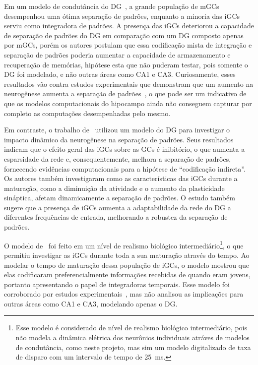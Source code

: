 Em um modelo de condutância do DG~\cite{kimEffect2024}, a grande população de mGCs desempenhou uma ótima separação de padrões,
enquanto a minoria das iGCs serviu como integradora de padrões. A presença das iGCs deteriorou a capacidade de separação de
padrões do DG em comparação com um DG composto apenas por mGCs, porém os autores postulam que essa codificação mista de integração
e separação de padrões poderia aumentar a capacidade de armazenamento e recuperação de memórias, hipótese esta que não puderam
testar, pois somente o DG foi modelado, e não outras áreas como CA1 e CA3. Curiosamente, esses resultados vão contra estudos
experimentais que demonstram que um aumento na neurogênese aumenta a separação de padrões~\cite{sahayIncreasing2011}, o que pode
ser um indicativo de que os modelos computacionais do hipocampo ainda não conseguem capturar por completo as computações
desempenhadas pelo mesmo.

Em contraste, o trabalho de~ utilizou um modelo do DG para investigar o impacto dinâmico da
neurogênese na separação de padrões. Seus resultados indicam que o efeito geral das iGCs sobre as GCs é inibitório, o que aumenta
a esparsidade da rede e, consequentemente, melhora a separação de padrões, fornecendo evidências computacionais para a hipótese de
``codificação indireta''. Os autores também investigaram como as características das iGCs durante a maturação, como a diminuição
da atividade e o aumento da plasticidade sináptica, afetam dinamicamente a separação de padrões. O estudo também sugere que a
presença de iGCs aumenta a adaptabilidade da rede do DG a diferentes frequências de entrada, melhorando a robustez da separação de
padrões.

O modelo de~ foi feito em um nível de realismo biológico intermediário\footnote{Esse modelo é
considerado de nível de realismo biológico intermediário, pois não modela a dinâmica elétrica dos neurônios individuais atráves de
modelos de condutância, como neste projeto, mas sim um modelo digitalizado de taxa de disparo com um intervalo de tempo de
\SI{25}{\milli\second}.}, o que permitiu investigar as iGCs durante toda a sua maturação através do tempo. Ao modelar o tempo de
maturação dessa população de iGCs, o modelo mostrou que elas codificaram preferencialmente informações recebidas de quando eram
jovens, portanto apresentando o papel de integradoras temporais. Esse modelo foi corroborado por estudos
experimentais~\cite{berdugo-vegaSharpening2023}, mas não analisou as implicações para outras áreas como CA1 e CA3, modelando
apenas o DG.

